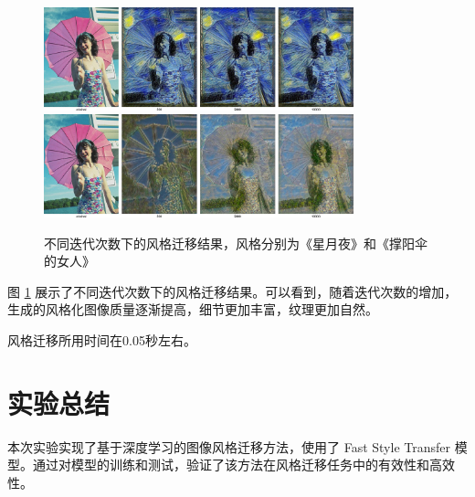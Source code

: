 \documentclass{article}
\begin{document}
\begin{figure}[H]
\centering
\includegraphics[width=0.8\textwidth]{img/output.jpg}
\includegraphics[width=0.8\textwidth]{img/output2.jpg}
\caption{不同迭代次数下的风格迁移结果，风格分别为《星月夜》和《撑阳伞的女人》}
\label{fig:output}
\end{figure}

图 \ref{fig:output} 展示了不同迭代次数下的风格迁移结果。可以看到，随着迭代次数的增加，生成的风格化图像质量逐渐提高，细节更加丰富，纹理更加自然。

风格迁移所用时间在0.05秒左右。

\section{实验总结}

本次实验实现了基于深度学习的图像风格迁移方法，使用了 Fast Style Transfer 模型。通过对模型的训练和测试，验证了该方法在风格迁移任务中的有效性和高效性。


\newpage
{}
{}
\printbibliography[title={\zihao{-3} \heiti \centering 参\ 考\ 文\ 献}]
\end{document}
